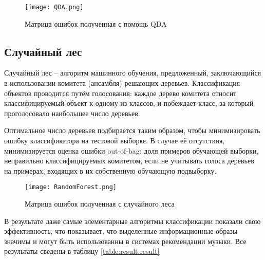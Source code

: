 \begin{figure}[h]
\centering
  \texttt{[image: QDA.png]}
  \caption{Матрица ошибок полученная с помощь QDA}
  \label{fig:results:QDA}
\end{figure}


\subsection{Случайный лес}

Случайный лес  -- алгоритм машинного обучения, предложенный, заключающийся в использовании комитета (ансамбля) решающих деревьев. Классификация объектов проводится путём голосования: каждое дерево комитета относит классифицируемый объект к одному из классов, и побеждает класс, за который проголосовало наибольшее число деревьев.

Оптимальное число деревьев подбирается таким образом, чтобы минимизировать ошибку классификатора на тестовой выборке. В случае её отсутствия, минимизируется оценка ошибки out-of-bag: доля примеров обучающей выборки, неправильно классифицируемых комитетом, если не учитывать голоса деревьев на примерах, входящих в их собственную обучающую подвыборку.

\begin{figure}[h]
\centering
  \texttt{[image: RandomForest.png]}
  \caption{Матрица ошибок полученная с случайного леса}
  \label{fig:results:RandomForest}
\end{figure}



В результате даже самые элементарные алгоритмы классификации показали свою эффективность, что показывает, что выделенные информационные образы значимы и могут быть использованны в системах рекомендации музыки. Все результаты сведены в таблицу
\ref{table:result:result}



